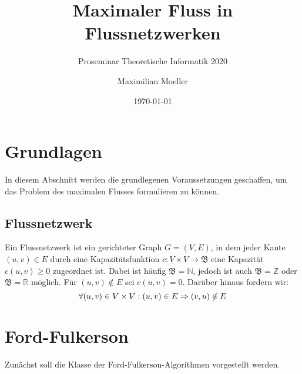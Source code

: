 \documentclass[12pt,a4paper,titlepage,onecolumn,ngerman,draft]{scrartcl}
\author{Maximilian Moeller}
\title{Maximaler Fluss in Flussnetzwerken}
\subtitle{Proseminar Theoretische Informatik 2020}
\date{\today}
\newcommand{\ff}{Ford-Fulkerson}
\begin{document}
\maketitle
\nocite{Cormen09}

\tableofcontents

\begin{abstract}
\end{abstract}

\section{Grundlagen}
In diesem Abschnitt werden die grundlegenen Voraussetzungen geschaffen, um das Problem des maximalen Flusses formulieren zu können.

\subsection{Flussnetzwerk}
Ein Flussnetzwerk ist ein gerichteter Graph $G = (V,E)$, in dem jeder Kante $(u,v) \in E$ durch eine Kapazitätsfunktion $c: V\times V\to\mathfrak{B}$ eine Kapazität $c(u,v) \geq 0$ zugeordnet ist.
Dabei ist häufig $\mathfrak{B} = \mathbb{N}$, jedoch ist auch $\mathfrak{B} = \mathbb{Z}$ oder $\mathfrak{B} = \mathbb{R}$ möglich.
Für $(u,v) \notin E$ sei $c(u,v) = 0$.
Darüber hinaus fordern wir: 
\begin{equation} \label{noparallel}
\forall (u,v)\in V\times V: (u,v)\in E \Rightarrow (v,u)\notin E\\
\end{equation}


\newpage
\section{\ff}
Zunächst soll die Klasse der \ff -Algorithmen vorgestellt werden.

\newpage
{}

\end{document}
